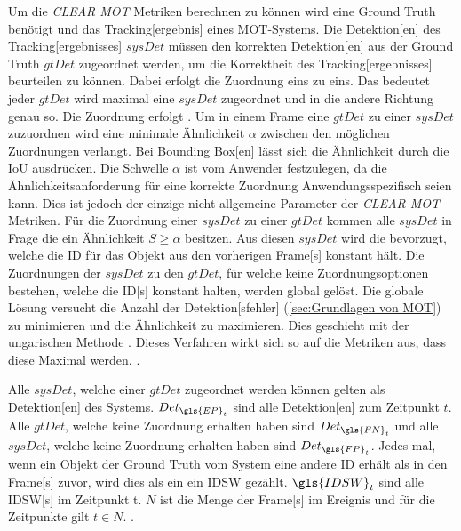 Um die \textit{\acrshort{CLEAR} \gls{MOT}} Metriken berechnen zu können wird eine \gls{Ground Truth} benötigt und das \gls{Tracking}[ergebnis] eines \gls{MOT}-Systems. Die \gls{Detektion}[en] des \gls{Tracking}[ergebnisses] \(sysDet\) müssen den korrekten \gls{Detektion}[en] aus der \gls{Ground Truth} \(gtDet\) zugeordnet werden, um die Korrektheit des \gls{Tracking}[ergebnisses] beurteilen zu können. Dabei erfolgt die Zuordnung eins zu eins. Das bedeutet jeder \(gtDet\) wird maximal eine \(sysDet\) zugeordnet und in die andere Richtung genau so. Die Zuordnung erfolgt . Um in einem \gls{Frame} eine \(gtDet\) zu einer \(sysDet\) zuzuordnen wird eine minimale Ähnlichkeit \(\alpha\) zwischen den möglichen Zuordnungen verlangt. Bei \gls{Bounding Box}[en] lässt sich die Ähnlichkeit durch die \gls{IoU} ausdrücken. Die Schwelle \(\alpha\) ist vom Anwender festzulegen, da die Ähnlichkeitsanforderung für eine korrekte Zuordnung Anwendungsspezifisch seien kann. Dies ist jedoch der einzige nicht allgemeine Parameter der \textit{\acrshort{CLEAR} \gls{MOT}} Metriken. Für die Zuordnung einer \(sysDet\) zu einer \(gtDet\) kommen alle \(sysDet\) in Frage die ein Ähnlichkeit \(S \geq \alpha\) besitzen. Aus diesen \(sysDet\) wird die bevorzugt, welche die \acrshort{ID} für das Objekt aus den vorherigen \gls{Frame}[s] konstant hält. Die Zuordnungen der \(sysDet\) zu den  \(gtDet\), für welche keine Zuordnungsoptionen bestehen, welche die \acrshort{ID}[s] konstant halten, werden global gelöst. Die globale Lösung versucht die Anzahl der \gls{Detektion}[sfehler] (\ref{sec:Grundlagen von MOT}) zu minimieren und die Ähnlichkeit zu maximieren. Dies geschieht mit der ungarischen Methode \cite{Kuhn.1955}. Dieses Verfahren wirkt sich so auf die Metriken aus, dass diese Maximal werden. \cite{CLEAR.2008, HOTA}. \par

Alle \(sysDet\), welche einer \(gtDet\) zugeordnet werden können gelten als  \gls{Detektion}[en] des Systems. \(Det_{\gls{EP}_t}\) sind alle  \gls{Detektion}[en] zum Zeitpunkt \(t\). Alle \(gtDet\), welche keine Zuordnung erhalten haben sind  \(Det_{\gls{FN}_t}\) und alle \(sysDet\), welche keine Zuordnung erhalten haben sind  \(Det_{\gls{FP}_t}\). Jedes mal, wenn ein Objekt der \gls{Ground Truth} vom System eine andere \acrshort{ID} erhält als in den \gls{Frame}[s] zuvor, wird dies als ein ein \gls{IDSW} gezählt. \(\gls{IDSW}_t\) sind alle \gls{IDSW}[s] im Zeitpunkt t. \(N\) ist die Menge der \gls{Frame}[s] im \gls{Ereignis} und für die Zeitpunkte gilt \(t \in N\). \cite{CLEAR.2008, IDF1}. \par

